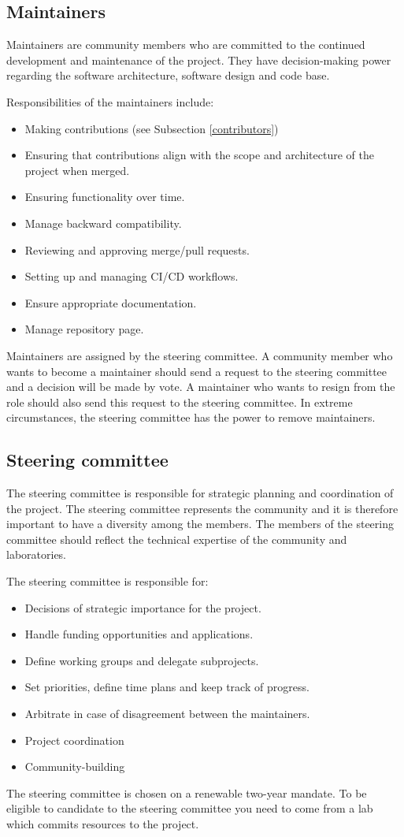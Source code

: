 \documentclass{article}
\begin{document}
\subsection{Maintainers}

Maintainers are community members who are committed to the continued development and maintenance of the project. They have decision-making power regarding the software architecture, software design and code base.

Responsibilities of the maintainers include:
\begin{itemize}
    \item Making contributions (see Subsection \ref{contributors})
    \item Ensuring that contributions align with the scope and architecture of the project when merged.
    \item Ensuring functionality over time.
    \item Manage backward compatibility.
    \item Reviewing and approving merge/pull requests.
    \item Setting up and managing CI/CD workflows.
    \item Ensure appropriate documentation.
    \item Manage repository page.
\end{itemize}

Maintainers are assigned by the steering committee. A community member who wants to become a maintainer should send a request to the steering committee and a decision will be made by vote. A maintainer who wants to resign from the role should also send this request to the steering committee. In extreme circumstances, the steering committee has the power to remove maintainers.

\subsection{Steering committee}

The steering committee is responsible for strategic planning and coordination of the project. The steering committee represents the community and it is therefore important to have a diversity among the members. The members of the steering committee should reflect the technical expertise of the community and laboratories.

The steering committee is responsible for:
\begin{itemize}
    \item Decisions of strategic importance for the project.
    \item Handle funding opportunities and applications.
    \item Define working groups and delegate subprojects.    
    \item Set priorities, define time plans and keep track of progress.
    \item Arbitrate in case of disagreement between the maintainers.
    \item Project coordination
    \item Community-building
\end{itemize}

The steering committee is chosen on a renewable two-year mandate. To be eligible to candidate to the steering committee you need to come from a lab which commits resources to the project.
\end{document}
